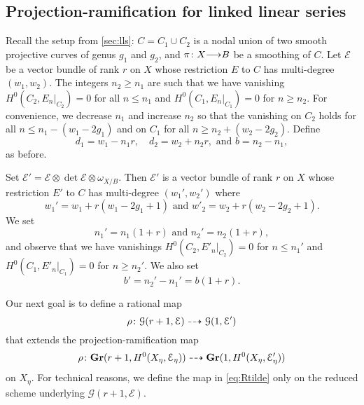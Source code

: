 \documentclass[11pt,reqno]{amsart}
\theoremstyle{plain}
\theoremstyle{definition}
\theoremstyle{remark}
\numberwithin{equation}{section}
\renewcommand{\to}{{\longrightarrow}}
\numberwithin{equation}{section}
\begin{document}
\subsection{Projection-ramification for linked linear series}
\label{sec:prlls}
Recall the setup from \autoref{sec:lls}: $C = C_1 \cup C_2$ is a nodal union of two smooth projective curves of genus $g_1$ and $g_2$, and $\pi \from X \to B$ be a smoothing of $C$.
Let $\mathcal E$ be a vector bundle of rank $r$ on $X$ whose restriction $E$ to $C$ has multi-degree $(w_1, w_2)$.
The integers $n_2 \geq n_1$ are such that we have vanishing $H^0(C_2, E_n|_{C_2}) = 0$ for all $n \leq n_1$ and $H^0(C_1, E_n|_{C_1}) = 0$ for $n \geq n_2$.
For convenience, we decrease $n_1$ and increase $n_2$ so that the vanishing on $C_2$ holds for all $n \leq n_1 - (w_1-2g_1)$ and on $C_1$ for all $n \geq n_2 + (w_2-2g_2)$.
Define
\[ d_1 = w_1 - n_1r, \quad d_2 = w_2 + n_2r,\text{ and } b = n_2 - n_1,\]
as before.

Set $\mathcal E' = \mathcal E \otimes \det \mathcal E \otimes \omega_{X/B}$.
Then $\mathcal E'$ is a vector bundle of rank $r$ on $X$ whose restriction $E'$ to $C$ has multi-degree $(w_1', w_2')$ where
\[ w_1' = w_1 + r(w_1-2g_1+1) \text{ and } w'_2 = w_2 + r(w_2-2g_2+1).\]
We set
\[ n_1' = n_1(1+r) \text{ and } n_2' = n_2(1+r),\]
and observe that we have vanishings $H^0(C_2, E'_{n}|_{C_2}) = 0$ for $n \leq n_1'$ and $H^0(C_1, E'_{n}|_{C_1}) = 0$ for $n \geq n_2'$.
We also set
\[ b' = n_2' - n_1' = b(1+r).\]

Our next goal is to define a rational map
\begin{equation}\label{eq:Rtilde}
  \rho {\colon} {\mathcal G}(r+1, \mathcal E) \dashrightarrow {\mathcal G}(1, \mathcal E')
\end{equation}
that extends the projection-ramification map
\[
  \rho {\colon} {\bf Gr}(r+1, H^0(X_\eta, \mathcal E_\eta)) \dashrightarrow {\bf Gr}(1, H^0(X_\eta, \mathcal E'_\eta))
\]
on $X_\eta$.
For technical reasons, we define the map in \eqref{eq:Rtilde} only on the reduced scheme underlying ${\mathcal G}(r+1, \mathcal E)$.
\end{document}
